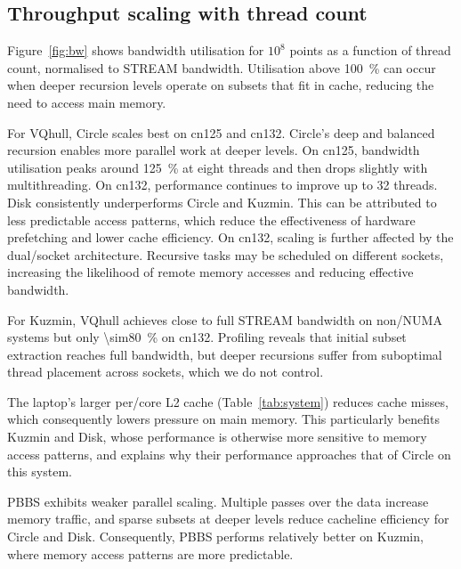 \documentclass[11pt,a4paper]{article}
\begin{document}
\subsection{Throughput scaling with thread count}
Figure~\ref{fig:bw} shows bandwidth utilisation for $10^8$ points as a function of thread count, normalised to STREAM bandwidth.
Utilisation above \qty{100}{\percent} can occur when deeper recursion levels operate on subsets that fit in cache, reducing the need to access main memory.

For VQhull, Circle scales best on cn125 and cn132.
Circle's deep and balanced recursion enables more parallel work at deeper levels.
On cn125, bandwidth utilisation peaks around \qty{125}{\percent} at eight threads and then drops slightly with multithreading.
On cn132, performance continues to improve up to 32 threads.
Disk consistently underperforms Circle and Kuzmin.
This can be attributed to less predictable access patterns, which reduce the effectiveness of hardware prefetching and lower cache efficiency.
On cn132, scaling is further affected by the dual\-/socket architecture.
Recursive tasks may be scheduled on different sockets, increasing the likelihood of remote memory accesses and reducing effective bandwidth.

For Kuzmin, VQhull achieves close to full STREAM bandwidth on non\-/NUMA systems but only \qty{\sim80}{\percent} on cn132.
Profiling reveals that initial subset extraction reaches full bandwidth, but deeper recursions suffer from suboptimal thread placement across sockets, which we do not control.

The laptop's larger per\-/core L2 cache (Table~\ref{tab:system}) reduces cache misses, which consequently lowers pressure on main memory.
This particularly benefits Kuzmin and Disk, whose performance is otherwise more sensitive to memory access patterns, and explains why their performance approaches that of Circle on this system.

PBBS exhibits weaker parallel scaling.
Multiple passes over the data increase memory traffic, and sparse subsets at deeper levels reduce cacheline efficiency for Circle and Disk.
Consequently, PBBS performs relatively better on Kuzmin, where memory access patterns are more predictable.
\end{document}
